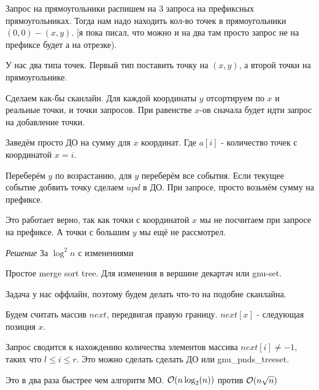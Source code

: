 Запрос на прямоугольники распишем на $3$ запроса на префиксных прямоугольниках. Тогда нам надо находить кол-во точек в прямоугольники $(0, 0)-(x, y)$. [я пока писал, что можно и на два там просто запрос не на префиксе будет а на отрезке).

У нас два типа точек. Первый тип поставить точку на $(x, y)$, а второй точки на прямоугольнике.

Сделаем как-бы сканлайн. Для каждой координаты $y$ отсортируем по $x$ и реальные точки, и точки запросов. При равенстве $x$-ов сначала будет идти запрос на добавление точки.

Заведём просто ДО на сумму для $x$ координат. Где $a[i]$ - количество точек с координатой $x=i$.

Переберём $y$ по возрастанию, для $y$ переберём все события. Если текущее событие добвить точку сделаем $upd$ в ДО. При запросе, просто возьмём сумму на префиксе.

Это работает верно, так как точки с координатой $x$ мы не посчитаем при запросе на префиксе.
А точки с большим $y$ мы ещё не рассмотрел.

{\it Решение } За $\log^2 n$ с изменениями

Простое merge sort tree. Для изменения в вершине декартач или gnu-set.



Задача у нас оффлайн, поэтому будем делать что-то на подобие сканлайна.

Будем считать массив $next$, передвигая правую границу. $next[x]$ - следующая позиция $x$.

Запрос сводится к нахождению количества элементов массива $next[i] \ne -1$, таких что $l \le i \le r$. Это можно сделать сделать ДО или gnu\_pnds\_treeset.

Это в два раза быстрее чем алгоритм МО. $ \mathcal{O}(n \log_2(n))$ против $ \mathcal{O}(n \sqrt n)$

